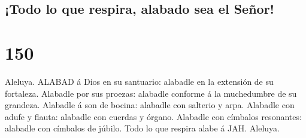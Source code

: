 \hypertarget{todo-lo-que-respira-alabado-sea-el-seuxf1or}{%
\subsection{¡Todo lo que respira, alabado sea el
Señor!}\label{todo-lo-que-respira-alabado-sea-el-seuxf1or}}

\hypertarget{section-149}{%
\section{150}\label{section-149}}

 Aleluya. ALABAD á Dios en su santuario: alabadle en la
extensión de su fortaleza.  Alabadle por sus proezas:
alabadle conforme á la muchedumbre de su grandeza.  Alabadle
á son de bocina: alabadle con salterio y arpa.  Alabadle con
adufe y flauta: alabadle con cuerdas y órgano.  Alabadle con
címbalos resonantes: alabadle con címbalos de júbilo.  Todo
lo que respira alabe á JAH. Aleluya.
